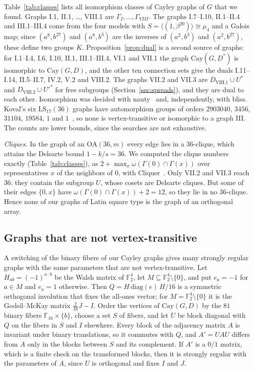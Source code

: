 \documentclass[11pt]{amsart}
\theoremstyle{definition}
\newcommand{\F}{\mathbb{F}}
\newcommand{\Cay}{\mathrm{Cay}}
\newcommand{\LS}{\mathrm{LS}}
\begin{document}
Table~\ref{tab:classes} lists all isomorphism classes of Cayley graphs of $G$ that we found. Graphs I.1, II.1, \dots, VIII.1 are $\Gamma_I,\dots,\Gamma_{VIII}$. The graphs I.7--I.10, II.1--II.4 and III.1--III.4 come from the four models with $S=\langle(1,\beta^{20})\rangle\cong\mu_4$ and a Galois map; since $(a^8,b^{27})$ and $(a^8,b^3)$ are the inverses of $(a^2,b^3)$ and $(a^2,b^{27})$, these define two groups $K$. Proposition~\ref{prop:dual} is a second source of graphs: for I.1--I.4, I.6, I.10, II.1, III.1--III.4, VI.1 and VII.1 the graph $\Cay(G,D^*)$ is isomorphic to $\Cay(G,D)$, and the other ten connection sets give the duals I.11--I.14, II.5--II.7, IV.2, V.2 and VIII.2. The graphs VII.2 and VII.3 are $D_{\mathrm{VIII}.1}\cup U^*$ and $D_{\mathrm{VIII}.2}\cup U'^*$ for free subgroups (Section~\ref{sec:spreads}), and they are dual to each other. Isomorphism was decided with nauty~\cite{McKayPiperno2014} and, independently, with bliss. Kova\v{l}'s six $\LS_{17}(36)$ graphs have automorphism groups of orders $2903040$, $3456$, $31104$, $19584$, $1$ and $1$~\cite{KovalMultiOrbit}, so none is vertex-transitive or isomorphic to a graph III. The counts are lower bounds, since the searches are not exhaustive.

\emph{Cliques.} In the graph of an $\mathrm{OA}(36,m)$ every edge lies in a $36$-clique, which attains the Delsarte bound $1-k/s=36$. We computed the clique numbers exactly (Table~\ref{tab:classes}), as $2+\max_x\omega(\Gamma(0)\cap\Gamma(x))$ over representatives $x$ of the neighbors of $0$, with Cliquer~\cite{Cliquer}. Only VII.2 and VII.3 reach $36$: they contain the subgroup $U$, whose cosets are Delsarte cliques. But some of their edges $\{0,x\}$ have $\omega(\Gamma(0)\cap\Gamma(x))+2=12$, so they lie in no $36$-clique. Hence none of our graphs of Latin square type is the graph of an orthogonal array.

\subsection{Graphs that are not vertex-transitive}\label{sec:switching}

A switching of the binary fibers of our Cayley graphs gives many strongly regular graphs with the same parameters that are not vertex-transitive. Let $H_{ab}=(-1)^{a\cdot b}$ be the Walsh matrix of $\F_2^4$, let $M\subseteq\F_2^4\setminus\{0\}$, and put $e_a=-1$ for $a\in M$ and $e_a=1$ otherwise. Then $Q=H\,\mathrm{diag}(e)\,H/16$ is a symmetric orthogonal involution that fixes the all-ones vector; for $M=\F_2^4\setminus\{0\}$ it is the Godsil--McKay matrix $\tfrac{2}{16}J-I$. Order the vertices of $\Cay(G,D)$ by the $81$ binary fibers $\F_{16}\times\{b\}$, choose a set $S$ of fibers, and let $U$ be block diagonal with $Q$ on the fibers in $S$ and $I$ elsewhere. Every block of the adjacency matrix $A$ is invariant under binary translations, so it commutes with $Q$, and $A'=UAU$ differs from $A$ only in the blocks between $S$ and its complement. If $A'$ is a $0/1$ matrix, which is a finite check on the transformed blocks, then it is strongly regular with the parameters of $A$, since $U$ is orthogonal and fixes $I$ and $J$.
\end{document}
